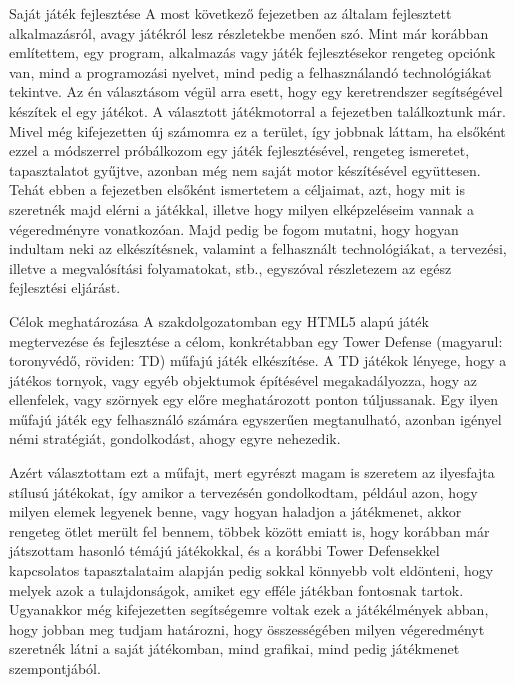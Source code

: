 \begin{MyChapter}{Saját játék fejlesztése}
	A most következő fejezetben az általam fejlesztett alkalmazásról, avagy játékról lesz részletekbe menően szó. Mint már korábban említettem, egy program, alkalmazás vagy játék fejlesztésekor rengeteg opciónk van, mind a programozási nyelvet, mind pedig a felhasználandó technológiákat tekintve. Az én választásom végül arra esett, hogy egy keretrendszer segítségével készítek el egy játékot. A választott játékmotorral a  fejezetben találkoztunk már. Mivel még kifejezetten új számomra ez a terület, így jobbnak láttam, ha elsőként ezzel a módszerrel próbálkozom egy játék fejlesztésével, rengeteg ismeretet, tapasztalatot gyűjtve, azonban még nem saját motor készítésével együttesen.
	Tehát ebben a fejezetben elsőként ismertetem a céljaimat, azt, hogy mit is szeretnék majd elérni a játékkal, illetve hogy milyen elképzeléseim vannak a végeredményre vonatkozóan. Majd pedig be fogom mutatni, hogy hogyan indultam neki az elkészítésnek, valamint a felhasznált technológiákat, a tervezési, illetve a megvalósítási folyamatokat, stb., egyszóval részletezem az egész fejlesztési eljárást.
	
	\begin{MySection}{Célok meghatározása}
		A szakdolgozatomban egy HTML5 alapú játék megtervezése és fejlesztése a célom, konkrétabban egy Tower Defense (magyarul: toronyvédő, röviden: TD) műfajú játék elkészítése. A TD játékok lényege, hogy a játékos tornyok, vagy egyéb objektumok építésével megakadályozza, hogy az ellenfelek, vagy szörnyek egy előre meghatározott ponton túljussanak. Egy ilyen műfajú játék egy felhasználó számára egyszerűen megtanulható, azonban igényel némi stratégiát, gondolkodást, ahogy egyre nehezedik. 
		
		Azért választottam ezt a műfajt, mert egyrészt magam is szeretem az ilyesfajta stílusú játékokat, így amikor a tervezésén gondolkodtam, például azon, hogy milyen elemek legyenek benne, vagy hogyan haladjon a játékmenet, akkor rengeteg ötlet merült fel bennem, többek között emiatt is, hogy korábban már játszottam hasonló témájú játékokkal, és a korábbi Tower Defensekkel kapcsolatos tapasztalataim alapján pedig sokkal könnyebb volt eldönteni, hogy melyek azok a tulajdonságok, amiket egy efféle játékban fontosnak tartok. Ugyanakkor még kifejezetten segítségemre voltak ezek a játékélmények abban, hogy jobban meg tudjam határozni, hogy összességében milyen végeredményt szeretnék látni a saját játékomban, mind grafikai, mind pedig játékmenet szempontjából.
		

\end{MySection}
\end{MyChapter}
